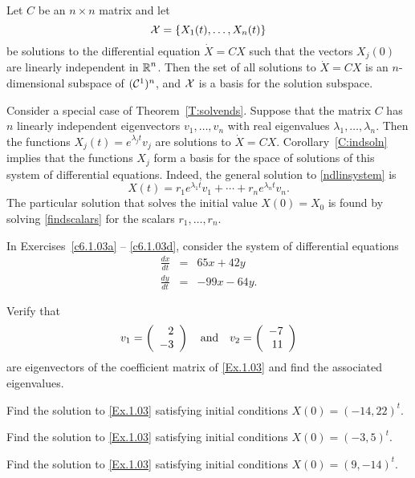 \documentclass{ximera}
\begin{document}
\begin{corollary}  \label{C:indsoln}
  Let $C$ be an $n\times n$ matrix and let \[
    {\cal X}=\{X_1(t),\ldots,X_n(t)\}\]
be solutions to the differential equation $\dot{X}=CX$ such that the vectors
$X_j(0)$ are linearly independent in $\mbox{$\Bbb{R}$}^n$.  Then the set of all solutions
to $\dot{X}=CX$ is an $n$-dimensional subspace of $({\cal C}^1)^n$, and
${\cal X}$ is a basis for the solution subspace.
\end{corollary}

Consider a special case of Theorem~\ref{T:solvends}.  Suppose that the
matrix $C$ has $n$ linearly independent eigenvectors $v_1,\ldots,v_n$ with
real eigenvalues $\lambda_1,\ldots,\lambda_n$.  Then the functions
$X_j(t)=e^{\lambda_j t}v_j$ are solutions to $\dot{X}=CX$.
Corollary~\ref{C:indsoln} implies that the functions $X_j$ form a basis for
the space of solutions of this system of differential equations.  Indeed,
the general solution to \eqref{ndlinsystem} is
\begin{equation}  \label{e:gensoln}
X(t) = r_1e^{\lambda_1 t}v_1 + \cdots + r_ne^{\lambda_n t}v_n.
\end{equation}
The particular solution that solves the initial value $X(0)=X_0$ is found by
solving \eqref{findscalars} for the scalars $r_1,\ldots,r_n$.





\EXER

\TEXER

\noindent In Exercises~\ref{c6.1.03a} -- \ref{c6.1.03d}, consider the system of
differential equations
\begin{equation} \label{Ex.1.03}
\begin{array}{rcr}
\frac{dx}{dt}  & = & 65x+42y \\
\frac{dy}{dt}  & = & -99x-64y.
\end{array}
\end{equation}
\begin{exercise} \label{c6.1.03a}
Verify that
\[
v_1 = \left(\begin{array}{r} 2 \\ -3\end{array}\right) \quad\mbox{and}\quad v_2 = \left(\begin{array}{r} -7 \\ 11\end{array}\right)
\]
are eigenvectors of the coefficient matrix of \eqref{Ex.1.03} and find
the associated eigenvalues.
\end{exercise}
\begin{exercise} \label{c6.1.03b}
Find the solution to \eqref{Ex.1.03} satisfying initial conditions $X(0) =
(-14,22)^t$.
\end{exercise}
\begin{exercise} \label{c6.1.03c}
Find the solution to \eqref{Ex.1.03} satisfying initial conditions $X(0) =
(-3,5)^t$.
\end{exercise}
\begin{exercise} \label{c6.1.03d}
Find the solution to \eqref{Ex.1.03} satisfying initial conditions $X(0) =
(9,-14)^t$.
\end{exercise}
\end{document}
